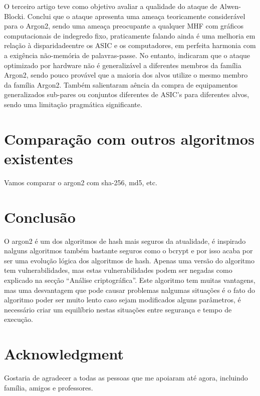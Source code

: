 \documentclass[conference]{IEEEtran}
\begin{document}
O terceiro artigo \cite{chen2017investigation} teve como objetivo avaliar a qualidade do 
ataque de Alwen-Blocki. Conclui que o ataque apresenta uma ameaça teoricamente considerável 
para o Argon2, sendo uma ameaça preocupante a qualquer MHF com gráficos computacionais 
de indegredo fixo, praticamente falando ainda é uma melhoria em relação à disparidadeentre 
os ASIC e os computadores, em perfeita harmonia com a exigência não-memória de palavras-passe. 
No entanto, indicaram que o ataque optimizado por hardware não é generalizável a diferentes 
membros da família Argon2, sendo pouco provável que a maioria dos alvos utilize o mesmo 
membro da família Argon2. Também salientaram aência da compra de equipamentos generalizados 
sub-pares ou conjuntos diferentes de ASIC's para diferentes alvos, sendo uma limitação 
pragmática significante.

\section{Comparação com outros algoritmos existentes}

Vamos comparar o argon2 com sha-256, md5, etc.

\section{Conclusão}

O argon2 é um dos algoritmos de hash mais seguros da atualidade, é inspirado nalguns 
algoritmos também bastante seguros como o bcrypt e por isso acaba por ser uma 
evolução lógica dos algoritmos de hash. Apenas uma versão do algoritmo tem 
vulnerabilidades, mas estas vulnerabilidades podem ser negadas como explicado na 
secção “Análise criptográfica”. Este algoritmo tem muitas vantagens, mas uma 
desvantagem que pode causar problemas nalgumas situações é o fato do algoritmo 
poder ser muito lento caso sejam modificados alguns parâmetros, é necessário 
criar um equilíbrio nestas situações entre segurança e tempo de execução.

\section*{Acknowledgment}

Gostaria de agradecer a todas as pessoas que me apoiaram até agora, incluindo
família, amigos e professores.



\end{document}
